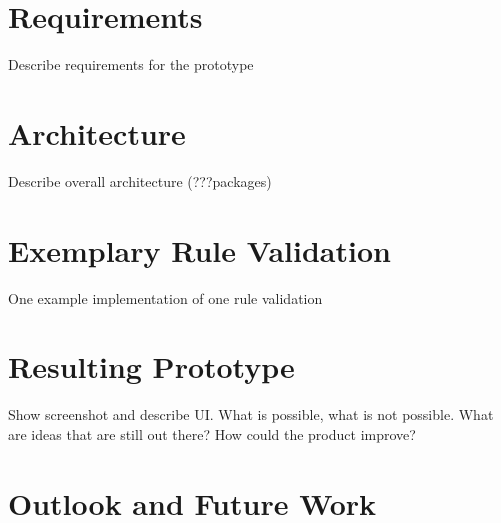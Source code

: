 \section{Requirements}
Describe requirements for the prototype
\section{Architecture}
Describe overall architecture (???packages)
\section{Exemplary Rule Validation}
One example implementation of one rule validation
\section{Resulting Prototype}
Show screenshot and describe UI. What is possible, what is not possible. 
What are ideas that are still out there? 
How could the product improve?
\section{Outlook and Future Work}



